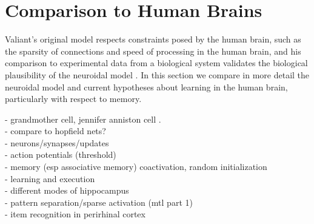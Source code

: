 \documentclass[letterpaper, 12pt]{article}
\begin{document}
\section{Comparison to Human Brains}
Valiant's original model respects constraints posed by the human brain, such as the sparsity of connections and speed of processing in the human brain, and his comparison to experimental data from a biological system validates the biological plausibility of the neuroidal model \cite{valiant_quantitative_2006}. In this section we compare in more detail the neuroidal model and current hypotheses about learning in the human brain, particularly with respect to memory.

- grandmother cell,  jennifer anniston cell \cite{quiroga_invariant_2005}.\\
- compare to hopfield nets?\\
- neurons/synapses/updates\\
- action potentials (threshold)\\
- memory (esp associative memory) coactivation, random initialization\\
- learning and execution\\
	- different modes of hippocampus\\

- pattern separation/sparse activation (mtl part 1)\\
- item recognition in perirhinal cortex %
\end{document}
